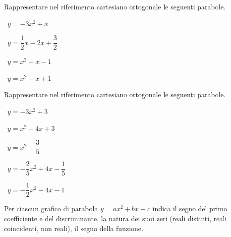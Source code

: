 \begin{esercizio}
 \label{ese:4.7}
Rappresentare nel riferimento cartesiano ortogonale le seguenti parabole.
\vspace{\dy}
\begin{multicols}{2}
 \begin{enumeratea}
 \item~\( y=-3x^2+x \)
 \item~\( y=\dfrac 1 2x-2x+\dfrac 3 2 \)
 \item~\( y=x^2+x-1 \)
 \item~\( y=x^2-x+1 \)
 \end{enumeratea}
 \end{multicols}
\end{esercizio}

\begin{esercizio}
 \label{ese:4.8}
Rappresentare nel riferimento cartesiano ortogonale le seguenti parabole.
\vspace{\dy}
\begin{multicols}{2}
 \begin{enumeratea}
 \item~\( y=-3x^2+3 \)
 \item~\( y=x^2+4x+3 \)
 \item~\( y=x^2+\dfrac 3 5 \)
 \item~\( y=-\dfrac 2 5x^2+4x-\dfrac 1 5 \)
 \item~\( y=-\dfrac 1 2 x^2-4x-1 \)
 \end{enumeratea}
 \end{multicols}
\end{esercizio}

\vspace{\dy}
\begin{minipage}{.39 \textwidth}
\begin{esercizio}
 \label{ese:4.9}
Per ciascun grafico di parabola \(y=ax^2+bx+c\) indica il segno del primo 
coefficiente e del discriminante, la natura dei suoi zeri (reali distinti, 
reali coincidenti, non reali), il segno della funzione.
\end{esercizio}
\end{minipage}
\hfill
\begin{minipage}{.59 \textwidth}
\begin{center}
 \scalebox{.7}{\parabole}
\end{center}
\end{minipage}

